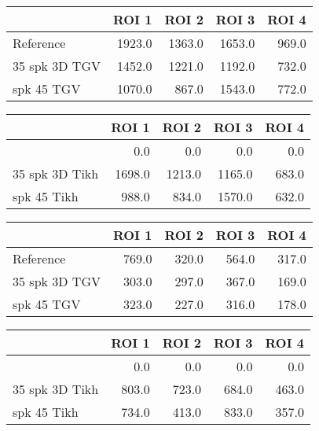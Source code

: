 \begin{tabular}{lrrrr}
\toprule
{} &   ROI 1 &   ROI 2 &   ROI 3 &  ROI 4 \\
\midrule
Reference     &  1923.0 &  1363.0 &  1653.0 &  969.0 \\
35 spk 3D TGV &  1452.0 &  1221.0 &  1192.0 &  732.0 \\
 spk 45 TGV   &  1070.0 &   867.0 &  1543.0 &  772.0 \\
\bottomrule
\end{tabular}
\begin{tabular}{lrrrr}
\toprule
{} &   ROI 1 &   ROI 2 &   ROI 3 &  ROI 4 \\
\midrule
               &     0.0 &     0.0 &     0.0 &    0.0 \\
35 spk 3D Tikh &  1698.0 &  1213.0 &  1165.0 &  683.0 \\
 spk 45 Tikh   &   988.0 &   834.0 &  1570.0 &  632.0 \\
\bottomrule
\end{tabular}
\begin{tabular}{lrrrr}
\toprule
{} &  ROI 1 &  ROI 2 &  ROI 3 &  ROI 4 \\
\midrule
Reference     &  769.0 &  320.0 &  564.0 &  317.0 \\
35 spk 3D TGV &  303.0 &  297.0 &  367.0 &  169.0 \\
 spk 45 TGV   &  323.0 &  227.0 &  316.0 &  178.0 \\
\bottomrule
\end{tabular}
\begin{tabular}{lrrrr}
\toprule
{} &  ROI 1 &  ROI 2 &  ROI 3 &  ROI 4 \\
\midrule
               &    0.0 &    0.0 &    0.0 &    0.0 \\
35 spk 3D Tikh &  803.0 &  723.0 &  684.0 &  463.0 \\
 spk 45 Tikh   &  734.0 &  413.0 &  833.0 &  357.0 \\
\bottomrule
\end{tabular}
